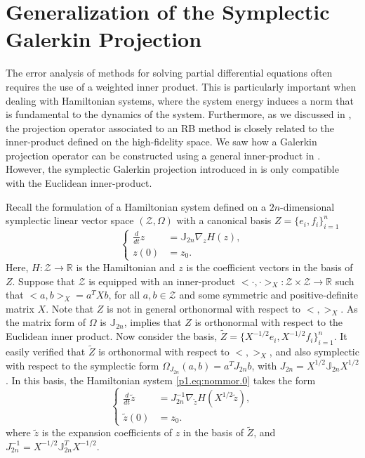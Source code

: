 \section{Generalization of the Symplectic Galerkin Projection} \label{sec:normmor.1}

The error analysis of methods for solving partial differential equations often requires the use of a weighted inner product. This is particularly important when dealing with Hamiltonian systems, where the system energy induces a norm that is fundamental to the dynamics of the system. Furthermore, as we discussed in , the projection operator associated to an RB method is closely related to the inner-product defined on the high-fidelity space. We saw how a Galerkin projection operator can be constructed using a general inner-product in . However, the symplectic Galerkin projection introduced in  is only compatible with the Euclidean inner-product.

Recall the formulation of a Hamiltonian system defined on a $2n$-dimensional symplectic linear vector space $(\mathcal Z,\Omega )$ with a canonical basis $Z=\{e_i,f_i\}_{i=1}^n$
\begin{equation} \label{p1.eq:nommor.0}
	\left\{
	\begin{aligned}
		\frac d {dt} z &= \mathbb J_{2n} \nabla_z H(z), \\
		z(0) &= z_0.
	\end{aligned}
	\right.
\end{equation}
Here, $H: \mathcal Z \to \mathbb R$ is the Hamiltonian and $z$ is the coefficient vectors in the basis of $Z$. Suppose that $\mathcal Z$ is equipped with an inner-product $<\cdot,\cdot>_X : \mathcal Z \times \mathcal Z \to \mathbb R$ such that $<a,b>_X = a^TXb$, for all $a,b\in\mathcal Z$ and some symmetric and positive-definite matrix $X$. Note that $Z$ is not in general orthonormal with respect to $<,>_X$. As the matrix form of $\Omega$ is $\mathbb J_{2n}$,  implies that $Z$ is orthonormal with respect to the Euclidean inner product. Now consider the basis, $\tilde Z = \{ X^{-1/2}e_i,X^{-1/2}f_i \}_{i=1}^{n}$. It easily verified that $\tilde Z$ is orthonormal with respect to $<,>_{X}$, and also symplectic with respect to the symplectic form $\Omega_{J_{2n}}(a,b) = a^T J_{2n} b $, with $J_{2n} = X^{1/2} \mathbb J_{2n}X^{1/2}$. In this basis, the Hamiltonian system \eqref{p1.eq:nommor.0} takes the form
\begin{equation} \label{p1.eq:nommor.0.1}
	\left\{
	\begin{aligned}
		\frac d {dt} \tilde z &= J^{-1}_{2n} \nabla_{\tilde z} H(X^{1/2}\tilde{z}), \\
		\tilde z(0) &= z_0.
	\end{aligned}
	\right.	
\end{equation}
where $\tilde z$ is the expansion coefficients of $z$ in the basis of $\tilde Z$, and $J_{2n}^{-1} = X^{-1/2} \mathbb J_{2n}^T X^{-1/2}$. 

